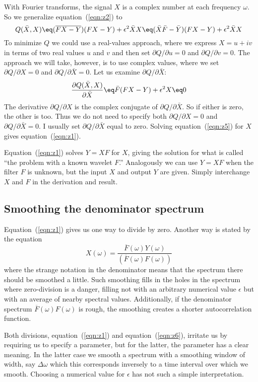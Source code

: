 \par
With Fourier transforms,
the signal $X$ is a complex number at each frequency $\omega$.
So we generalize equation~(\ref{eqn:z2}) to
\begin{equation}
Q(\bar X, X) \eq
(\overline{FX-Y})        (FX-Y) + \epsilon^2 \bar X X \eq
(\bar X \bar F - \bar Y) (FX-Y) + \epsilon^2 \bar X X
\label{eqn:z4}
\end{equation}
To minimize $Q$ we could use a real-values approach,
where we express
$X=u+iv$ in terms of two real values $u$ and $v$
and then set $\partial Q/\partial u=0$ and $\partial Q/\partial v=0$.
The approach we will take, however,
is to use complex values,
where we set
$\partial Q/\partial X=0$ and $\partial Q/\partial \bar X=0$.
Let us examine $\partial Q/\partial \bar X$:
\begin{equation}
{\partial Q(\bar X, X)\over \partial  \bar X}  \eq
\bar F (FX-Y) + \epsilon^2  X  \eq 0
\label{eqn:z5}
\end{equation}
The derivative $\partial Q/\partial X$ is
the complex conjugate of $\partial Q/\partial \bar X$.
So if either is zero, the other is too.
Thus we do not need to specify both
$\partial Q/\partial X=0$ and $\partial Q/\partial \bar X=0$.
I usually set
$\partial Q/\partial \bar X$ equal to zero.
Solving equation~(\ref{eqn:z5}) for $X$
gives equation~(\ref{eqn:z1}).

\par
Equation~(\ref{eqn:z1}) solves $Y=XF$ for $X$,
giving the solution for what is called
``the  problem with a known wavelet $F$.''
Analogously we can use $Y=XF$ when the filter $F$ is unknown,
but the input $X$ and output $Y$ are given.
Simply interchange $X$ and $F$ in the derivation and result.

\subsection{Smoothing the denominator spectrum}

\par
Equation~(\ref{eqn:z1}) gives us one way to divide by zero.
Another way is stated by the equation
\begin{equation}
X(\omega) = \frac{ \overline{F}(\omega) Y(\omega) }
{\left(
\overline{F}(\omega)  F(\omega)
\right) }
\label{eqn:z6}
\end{equation}
where the strange notation in the denominator means
that the spectrum there should be smoothed a little.
Such smoothing fills in the holes in the spectrum
where zero-division is a danger,
filling not with an arbitrary numerical value $\epsilon$
but with an average of nearby spectral values.
Additionally, if the denominator spectrum
$\overline{F}(\omega) F(\omega)$ is rough,
the smoothing creates a shorter autocorrelation function.
\par
Both divisions,
equation~(\ref{eqn:z1}) and
equation~(\ref{eqn:z6}),
irritate us by requiring us to specify a parameter,
but for the latter, the parameter has a clear meaning.
In the latter case we smooth a spectrum with a smoothing
window of width, say $\Delta\omega$
which this corresponds inversely to a time interval over which we smooth.
Choosing a numerical value for  $\epsilon$ has not such a simple interpretation.


